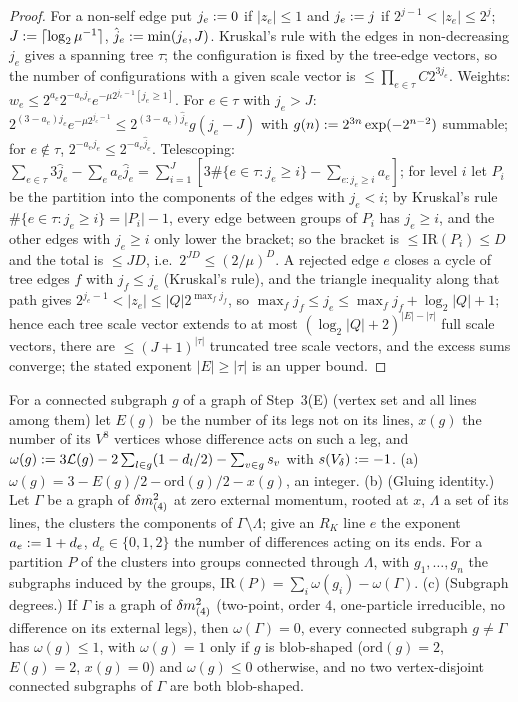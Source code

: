 \begin{proof}
For a non-self edge put $j_e:=0$ if $|z_e|\le1$ and $j_e:= j$ if $2^{j-1}<|z_e|\le2^j$; $J:=\lceil\log_2\mu^{-1}\rceil$, $\hat j_e:=\min(j_e,J)$. Kruskal's rule with the edges in non-decreasing $j_e$ gives a spanning tree $\tau$; the configuration is fixed by the tree-edge vectors, so the number of configurations with a given scale vector is $\le\prod_{e\in\tau}C2^{3j_e}$. Weights: $w_e\le2^{a_e}2^{-a_ej_e}e^{-\mu2^{j_e-1}[j_e\ge1]}$. For $e\in\tau$ with $j_e>J$: $2^{(3-a_e)j_e}e^{-\mu2^{j_e-1}}\le2^{(3-a_e)\hat j_e}g(j_e-J)$ with $g(n):=2^{3n}\exp(-2^{n-2})$ summable; for $e\notin\tau$, $2^{-a_ej_e}\le2^{-a_e\hat j_e}$. Telescoping: $\sum_{e\in\tau}3\hat j_e-\sum_ea_e\hat j_e=\sum_{i=1}^J[3\#\{e\in\tau:j_e\ge i\}-\sum_{e:j_e\ge i}a_e]$; for level $i$ let $P_i$ be the partition into the components of the edges with $j_e<i$; by Kruskal's rule $\#\{e\in\tau:j_e\ge i\}=|P_i|-1$, every edge between groups of $P_i$ has $j_e\ge i$, and the other edges with $j_e\ge i$ only lower the bracket; so the bracket is $\le\mathrm{IR}(P_i)\le D$ and the total is $\le JD$, i.e.\ $2^{JD}\le(2/\mu)^D$. A rejected edge $e$ closes a cycle of tree edges $f$ with $j_f\le j_e$ (Kruskal's rule), and the triangle inequality along that path gives $2^{j_e-1}<|z_e|\le|Q|2^{\max_fj_f}$, so $\max_fj_f\le j_e\le\max_fj_f+\log_2|Q|+1$; hence each tree scale vector extends to at most $(\log_2|Q|+2)^{|E|-|\tau|}$ full scale vectors, there are $\le(J+1)^{|\tau|}$ truncated tree scale vectors, and the excess sums converge; the stated exponent $|E|\ge|\tau|$ is an upper bound.
\end{proof}

\begin{lemma}[degrees]\label{lem:a06e:ID}
For a connected subgraph $g$ of a graph of Step~3(E) (vertex set and all lines among them) let $E(g)$ be the number of its legs not on its lines, $x(g)$ the number of its $V^8$ vertices whose difference acts on such a leg, and $\omega(g):=3\mathcal L(g)-2\sum_{l\in g}(1-d_l/2)-\sum_{v\in g}s_v$ with $s(V_\delta):=-1$. \textup{(a)} $\omega(g)=3-E(g)/2-\mathrm{ord}(g)/2-x(g)$, an integer. \textup{(b)} (Gluing identity.) Let $\Gamma$ be a graph of $\delta m^2_{(4)}$ at zero external momentum, rooted at $x$, $\Lambda$ a set of its lines, the clusters the components of $\Gamma\setminus\Lambda$; give an $R_K$ line $e$ the exponent $a_e:=1+d_e$, $d_e\in\{0,1,2\}$ the number of \cite[(1.8)]{Ba3} differences acting on its ends. For a partition $P$ of the clusters into groups connected through $\Lambda$, with $g_1,\dots,g_n$ the subgraphs induced by the groups, $\mathrm{IR}(P)=\sum_i\omega(g_i)-\omega(\Gamma)$. \textup{(c)} (Subgraph degrees.) If $\Gamma$ is a graph of $\delta m^2_{(4)}$ (two-point, order $4$, one-particle irreducible, no difference on its external legs), then $\omega(\Gamma)=0$, every connected subgraph $g\ne\Gamma$ has $\omega(g)\le1$, with $\omega(g)=1$ only if $g$ is blob-shaped ($\mathrm{ord}(g)=2$, $E(g)=2$, $x(g)=0$) and $\omega(g)\le0$ otherwise, and no two vertex-disjoint connected subgraphs of $\Gamma$ are both blob-shaped.
\end{lemma}

